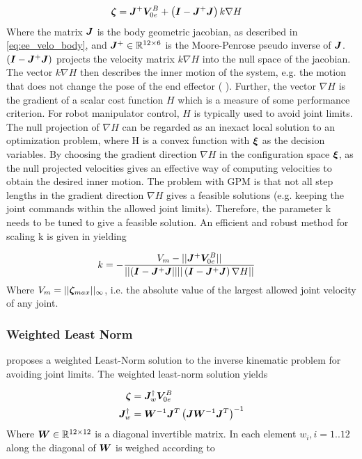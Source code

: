 \begin{align}
	\boldsymbol	\zeta	&= \boldsymbol J^{+}\boldsymbol V_{0e}^B + \left( \boldsymbol I -\boldsymbol J^{+} \boldsymbol J \right)k \nabla H
	\label{eq:gpm1}
\end{align}
Where the matrix $\boldsymbol J$ is the body geometric jacobian, as described in \eqref{eq:ee_velo_body}, and $\boldsymbol J^+ \in \mathbb{R}^{12\times 6}$ is the Moore-Penrose pseudo inverse of $\boldsymbol J$. $\left( \boldsymbol I - \boldsymbol J^{+}\boldsymbol J\right)$ projects the velocity matrix $k \nabla H$ into the null space of the jacobian. The vector $k \nabla H$ then describes the inner motion of the system, e.g. the motion that does not change the pose of the end effector (\cite{Liegeois1977} ).
Further, the vector $\nabla H$ is the gradient of a scalar cost function $H$ which is a measure of some performance criterion. For robot manipulator control, $H$ is typically used to avoid joint limits. The null projection of $\nabla H$
can be regarded as an inexact local solution to an optimization problem, where H is a convex function with $\boldsymbol \xi$ as the decision variables. By choosing the gradient direction $\nabla H$ in the configuration space $\boldsymbol \xi$, as the null projected velocities gives an effective way of computing velocities to obtain the desired inner motion. The problem with GPM is that not all step lengths in the gradient direction $\nabla H$ gives a feasible solutions (e.g. keeping the joint commands within the allowed joint limits). Therefore, the parameter k needs to be tuned to give a feasible solution. An efficient and robust method for scaling k is given in \cite{5723588} yielding

\begin{align}
	k&= - \frac{V_{m} - || \boldsymbol J^{+}\boldsymbol V_{0e}^B|| }{||(\boldsymbol I - \boldsymbol J^{+}\boldsymbol J|| ||\left(\boldsymbol I - \boldsymbol J^{+}\boldsymbol J \right) \nabla H||} 
	\label{eq:k-scaling}
\end{align}
Where $V_{m}=||\boldsymbol \zeta_{max}||_{\infty}$, i.e. the absolute value of the largest allowed joint velocity of any joint. 

\subsubsection{Weighted Least Norm}
\cite{370511} proposes a weighted Least-Norm solution to the inverse kinematic problem for avoiding joint limits. The weighted least-norm solution yields

\begin{align}
	\boldsymbol \zeta &=\boldsymbol J_{w}^{\dagger}  \boldsymbol V_{0e}^B
	\label{eq:wln1}
\\
\boldsymbol J_{w}^{\dagger}&= \boldsymbol W^{-1} \boldsymbol J^{T} \left( \boldsymbol J \boldsymbol W^{-1} \boldsymbol J^{T} \right)^{-1}
	\label{eq:wln2}
\end{align}
Where $\boldsymbol W \in \mathbb{R}^{12 \times 12}$ is a diagonal invertible matrix. In \cite{370511} each element $w_{i}, i=1 .. 12$ along the diagonal of $\boldsymbol W$ is weighed according to 

